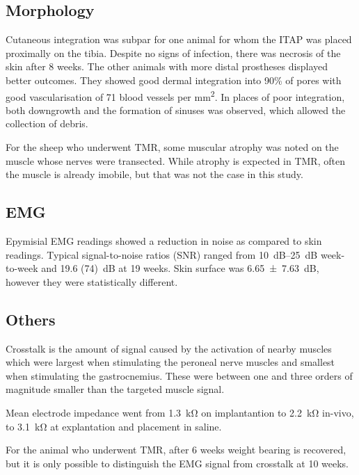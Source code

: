 \subsection{Morphology}
Cutaneous integration was subpar for one animal for whom the ITAP was placed proximally on the tibia.
Despite no signs of infection, there was necrosis of the skin after 8 weeks.
The other animals with more distal prostheses displayed better outcomes.
They showed good dermal integration into 90\% of pores with good vascularisation of 71 blood vessels per \si{\milli\metre\squared}.
In places of poor integration, both downgrowth and the formation of sinuses was observed, which allowed the collection of debris.

For the sheep who underwent TMR, some muscular atrophy was noted on the muscle whose nerves were transected. While atrophy is expected in TMR, often the muscle is already imobile, but that was not the case in this study.

\subsection{EMG}
Epymisial EMG readings showed a reduction in noise as compared to skin readings. Typical signal-to-noise ratios (SNR) ranged from \SIrange{10}{25}{\deci\bel} week-to-week and \SI{19.6 (74)}{\deci\bel} at 19 weeks.
Skin surface was \SI{6.65(763)}{\deci\bel}, however they were statistically different.

\subsection{Others}
Crosstalk is the amount of signal caused by the activation of nearby muscles which were largest when stimulating the peroneal nerve muscles and smallest when stimulating the gastrocnemius.
These were between one and three orders of magnitude smaller than the targeted muscle signal.

Mean electrode impedance went from \SI{1.3}{\kilo\ohm} on implantantion to \SI{2.2}{\kilo\ohm} in-vivo, to \SI{3.1}{\kilo\ohm} at explantation and placement in saline.

For the animal who underwent TMR, after 6 weeks weight bearing is recovered, but it is only possible to distinguish the EMG signal from crosstalk at 10 weeks.  
